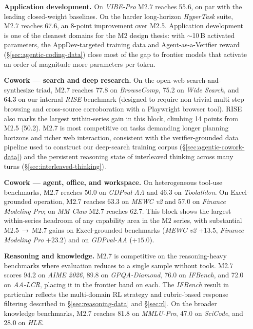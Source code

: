 \noindent \textbf{Application development.} On \emph{VIBE-Pro} M2.7 reaches 55.6, on par with the leading closed-weight baselines. On the harder long-horizon \emph{HyperTask} suite, M2.7 reaches 67.6, an 8-point improvement over M2.5. Application development is one of the cleanest domains for the M2 design thesis: with $\sim$10\,B activated parameters, the AppDev-targeted training data and Agent-as-a-Verifier reward (\S\ref{sec:agentic-coding-data}) close most of the gap to frontier models that activate an order of magnitude more parameters per token.

\noindent \textbf{Cowork --- search and deep research.} On the open-web search-and-synthesize triad, M2.7 reaches 77.8 on \emph{BrowseComp}, 75.2 on \emph{Wide Search}, and 64.3 on our internal \emph{RISE} benchmark (designed to require non-trivial multi-step browsing and cross-source corroboration with a Playwright browser tool). RISE also marks the largest within-series gain in this block, climbing 14 points from M2.5 (50.2). M2.7 is most competitive on tasks demanding longer planning horizons and richer web interaction, consistent with the verifier-grounded data pipeline used to construct our deep-search training corpus (\S\ref{sec:agentic-cowork-data}) and the persistent reasoning state of interleaved thinking across many turns (\S\ref{sec:interleaved-thinking}).

\noindent \textbf{Cowork --- agent, office, and workspace.} On heterogeneous tool-use benchmarks, M2.7 reaches 50.0 on \emph{GDPval-AA} and 46.3 on \emph{Toolathlon}. On Excel-grounded operation, M2.7 reaches 63.3 on \emph{MEWC v2} and 57.0 on \emph{Finance Modeling Pro}; on \emph{MM Claw} M2.7 reaches 62.7. This block shows the largest within-series headroom of any capability area in the M2 series, with substantial M2.5\,$\to$\,M2.7 gains on Excel-grounded benchmarks (\emph{MEWC v2} $+13.5$, \emph{Finance Modeling Pro} $+23.2$) and on \emph{GDPval-AA} ($+15.0$).

\noindent \textbf{Reasoning and knowledge.} M2.7 is competitive on the reasoning-heavy benchmarks where evaluation reduces to a single sample without tools. M2.7 scores 94.2 on \emph{AIME 2026}, 89.8 on \emph{GPQA-Diamond}, 76.0 on \emph{IFBench}, and 72.0 on \emph{AA-LCR}, placing it in the frontier band on each. The \emph{IFBench} result in particular reflects the multi-domain RL strategy and rubric-based response filtering described in \S\ref{sec:reasoning-data} and \S\ref{sec:rl}. On the broader knowledge benchmarks, M2.7 reaches 81.8 on \emph{MMLU-Pro}, 47.0 on \emph{SciCode}, and 28.0 on \emph{HLE}.

